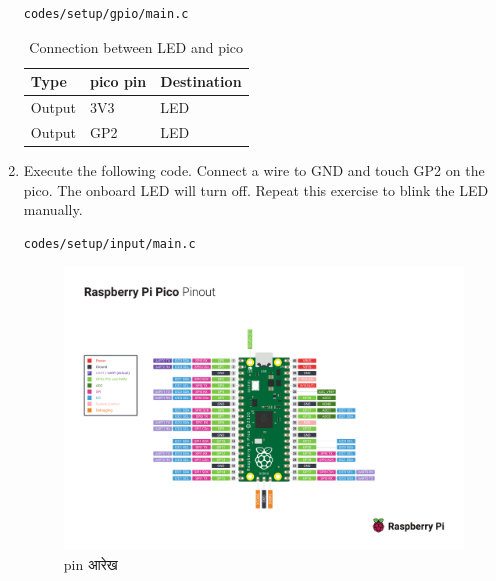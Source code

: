 \documentclass[journal,12pt,twocolumn]{IEEEtran}
\renewcommand\thesection{\arabic{section}}
\begin{document}
\begin{enumerate}[label=\thesection.\arabic*.,ref=\thesection.\theenumi]
\begin{lstlisting}
codes/setup/gpio/main.c
\end{lstlisting}

\begin{table}[!ht]
\centering
\begin{tabular}{|l|l|l|}
\hline
Type & pico  pin  &  Destination \\ \hline
Output &  3V3 &  LED\\ \hline
Output  & GP2  &  LED\\ \hline
\end{tabular}
\caption{Connection between LED and pico}
\label{table:setup_led}
\end{table}

\item  Execute the following code.  Connect a wire to GND and touch GP2 on the pico.  The onboard LED will turn off.
Repeat this exercise to blink the LED manually.
\begin{lstlisting}
codes/setup/input/main.c
\end{lstlisting}


\begin{figure}[!ht]
\centering
\includegraphics[width = \textwidth]{figs/pin_sheet.pdf}
\caption{pin आरेख}
\label{fig:pin_sheet}
\end{figure}
\end{enumerate}
\end{document}
